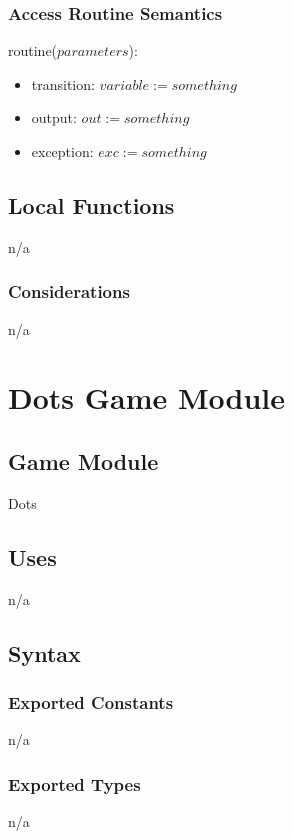 \documentclass[12pt]{article}
\begin{document}
\subsubsection* {Access Routine Semantics}
\noindent routine($parameters$):
\begin{itemize}
    \item transition: $variable := something$
    \item output: $out := something$
    \item exception: $exc := something$
\end{itemize}


\subsection*{Local Functions}
n/a


\subsubsection* {Considerations}
n/a



\newpage
\section* {Dots Game Module}
\subsection*{Game Module}
Dots


\subsection* {Uses}
n/a


\subsection* {Syntax}
\subsubsection* {Exported Constants}
n/a

\subsubsection* {Exported Types}
n/a
\end{document}
